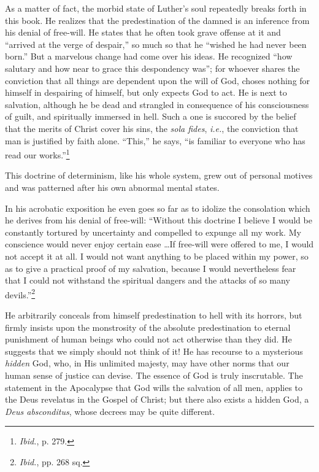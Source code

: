 As a matter of fact, the morbid state of Luther's soul repeatedly
breaks forth in this book. He realizes that the predestination of the
damned is an inference from his denial of free-will. He states that
he often took grave offense at it and ``arrived at the verge of despair,''
so much so that he ``wished he had never been born.'' But a marvelous
change had come over his ideas. He recognized ``how salutary and
how near to grace this despondency was''; for whoever shares the
conviction that all things are dependent upon the will of God, choses
nothing for himself in despairing of himself, but only expects God
to act. He is next to salvation, although he be dead and strangled in
consequence of his consciousness of guilt, and spiritually immersed in
hell. Such a one is succored by the belief that the merits of Christ
cover his sins, the \textit{sola fides}, \textit{i.e.}, the conviction that man is justified
by faith alone. ``This,'' he says, ``is familiar to everyone who has read
our works.''\footnote{\textit{Ibid.}, p. 279. }

This doctrine of determinism, like his whole system, grew out
of personal motives and was patterned after his own abnormal mental
states.

In his acrobatic exposition he even goes so far as to idolize the consolation
which he derives from his denial of free-will: ``Without this doctrine I
believe I would be constantly tortured by uncertainty and compelled to
expunge all my work. My conscience would never enjoy certain ease \dots If
free-will were offered to me, I would not accept it at all. I would not
want anything to be placed within my power, so as to give a practical proof
of my salvation, because I would nevertheless fear that I could not withstand
the spiritual dangers and the attacks of so many devils.”\footnote{\textit{Ibid.}, pp. 268 sq.}

He arbitrarily conceals from himself predestination to hell with its horrors,
but firmly insists upon the monstrosity of the absolute predestination to
eternal punishment of human beings who could not act otherwise than they
did. He suggests that we simply should not think of it! He has recourse to a
mysterious \textit{hidden} God, who, in His unlimited majesty, may have other
norms that our human sense of justice can devise. The essence of God is truly
inscrutable. The statement in the Apocalypse that God wills the salvation of
all men, applies to the Deus revelatus in the Gospel of Christ; but there
also exists a hidden God, a \textit{Deus absconditus}, whose decrees may be quite
different.

